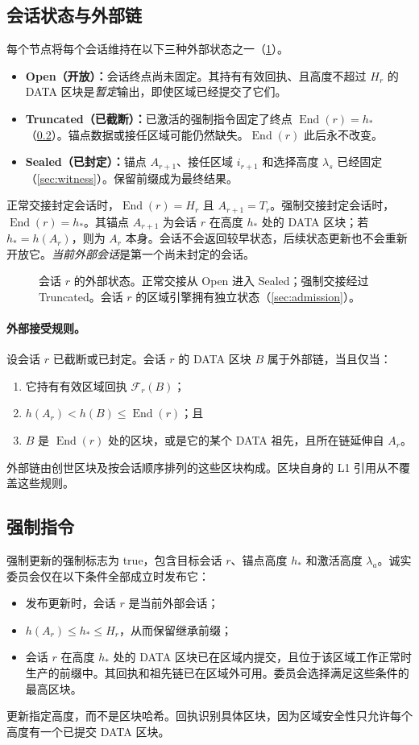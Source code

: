 \documentclass[11pt,a4paper]{article}
\newcommand{\FC}{\mathcal F}
\newcommand{\End}{\operatorname{End}}
\begin{document}
\subsection{会话状态与外部链}\label{sec:states}
每个节点将每个会话维持在以下三种外部状态之一（\cref{fig:states}）。
\begin{itemize}
\item \textbf{Open（开放）：}会话终点尚未固定。其持有有效回执、且高度不超过 $H_r$ 的 DATA 区块是\emph{暂定}输出，即使区域已经提交了它们。
\item \textbf{Truncated（已截断）：}已激活的强制指令固定了终点 $\End(r)=h_*$（\cref{sec:force}）。锚点数据或接任区域可能仍然缺失。$\End(r)$ 此后永不改变。
\item \textbf{Sealed（已封定）：}锚点 $A_{r+1}$、接任区域 $i_{r+1}$ 和选择高度 $\lambda_s$ 已经固定（\cref{sec:witness}）。保留前缀成为最终结果。
\end{itemize}
正常交接封定会话时，$\End(r)=H_r$ 且 $A_{r+1}=T_r$。强制交接封定会话时，$\End(r)=h_*$。其锚点 $A_{r+1}$ 为会话 $r$ 在高度 $h_*$ 处的 DATA 区块；若 $h_*=h(A_r)$，则为 $A_r$ 本身。会话不会返回较早状态，后续状态更新也不会重新开放它。\emph{当前外部会话}是第一个尚未封定的会话。
\begin{figure}[htbp]\centering

\caption{会话 $r$ 的外部状态。正常交接从 Open 进入 Sealed；强制交接经过 Truncated。会话 $r$ 的区域引擎拥有独立状态（\cref{sec:admission}）。}\label{fig:states}
\end{figure}

\paragraph{外部接受规则。}
设会话 $r$ 已截断或已封定。会话 $r$ 的 DATA 区块 $B$ 属于外部链，当且仅当：
\begin{enumerate}[label=(\roman*)]
\item 它持有有效区域回执 $\FC_r(B)$；
\item $h(A_r)<h(B)\le\End(r)$；且
\item $B$ 是 $\End(r)$ 处的区块，或是它的某个 DATA 祖先，且所在链延伸自 $A_r$。
\end{enumerate}
外部链由创世区块及按会话顺序排列的这些区块构成。区块自身的 L1 引用从不覆盖这些规则。

\subsection{强制指令}\label{sec:force}
强制更新的强制标志为 true，包含目标会话 $r$、锚点高度 $h_*$ 和激活高度 $\lambda_a$。诚实委员会仅在以下条件全部成立时发布它：
\begin{itemize}
\item 发布更新时，会话 $r$ 是当前外部会话；
\item $h(A_r)\le h_*\le H_r$，从而保留继承前缀；
\item 会话 $r$ 在高度 $h_*$ 处的 DATA 区块已在区域内提交，且位于该区域工作正常时生产的前缀中。其回执和祖先链已在区域外可用。委员会选择满足这些条件的最高区块。
\end{itemize}
更新指定高度，而不是区块哈希。回执识别具体区块，因为区域安全性只允许每个高度有一个已提交 DATA 区块。
\end{document}
